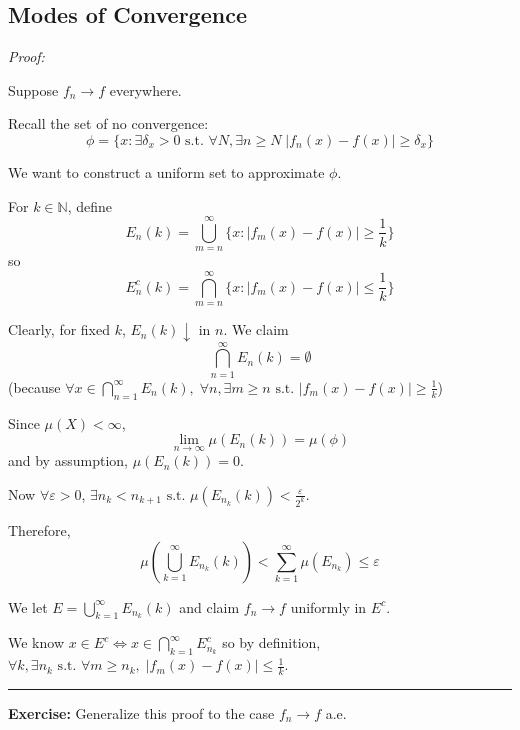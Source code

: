 \documentclass[12pt]{report}
\newcommand{\N}{\mathbb{N}}
\newcommand{\abs}[1]{\left\vert #1 \right\vert}
\newcommand{\ep}{\varepsilon}
\newcommand{\sub}{\subseteq}
\newcommand{\st}{\text{ s.t. }}
\renewcommand{\div}{\vspace*{10pt}\hrule\vspace*{10pt}}
\newenvironment*{tbox}[2][gray]{
    \begin{tcolorbox}[
        parbox=false,
        colback=#1!5!white,
        colframe=#1!75!black,
        breakable,
        title={#2}
    ]}
    {\end{tcolorbox}}
\newenvironment*{exercise}[1][red]{
    \begin{tcolorbox}[
        parbox=false,
        colback=#1!5!white,
        colframe=#1!75!black,
        breakable
    ]}
    {\end{tcolorbox}}
\begin{document}
    \subsection*{Modes of Convergence}
        \begin{tbox}{\textbf{Egorov Theorem:} Suppose $\mu(X) < \infty$ and $f_n \to f$ a.e. Then $\forall \ep > 0$, $\exists E \sub X$ such that $\mu(E) < \ep$ with $f_n - f \to 0$ uniformly on $E^c$}
            \emph{Proof:} 

            Suppose $f_n \to f$ everywhere. 

            Recall the set of no convergence: 
            \[\phi = \{x: \exists \delta_x > 0 \st \forall N, \exists n \geq N \; \abs{f_n(x) - f(x)} \geq \delta_x\}\]

            We want to construct a uniform set to approximate $\phi$. 

            For $k \in \N$, define 
            \[E_n(k) = \bigcup_{m=n}^\infty \{x: \abs{f_m(x) - f(x)} \geq \frac{1}{k}\}\]
            so 
            \[E_n^c(k) = \bigcap_{m=n}^{\infty} \{x: \abs{f_m(x) - f(x)} \leq \frac{1}{k}\}\]

            Clearly, for fixed $k$, $E_n(k) \downarrow$ in $n$. We claim 
            \[\bigcap_{n=1}^\infty E_n(k) = \emptyset\]
            (because $\forall x \in \bigcap_{n=1}^\infty E_n(k), \; \forall n, \exists m \geq n \st \abs{f_m(x) - f(x)} \geq \frac{1}{k}$)

            Since $\mu(X) < \infty$, 
            \[\lim_{n \to \infty} \mu(E_n(k)) = \mu(\phi)\] 
            and by assumption, $\mu(E_n(k)) = 0$. 

            Now $\forall \ep > 0$, $\exists n_k < n_{k+1} \st \mu(E_{n_k}(k)) < \frac{\ep}{2^k}$. 

            Therefore, 
            \[\mu\left(\bigcup_{k=1}^\infty E_{n_k}(k)\right) < \sum_{k=1}^{\infty} \mu(E_{n_k}) \leq \ep \]

            We let $E = \bigcup_{k=1}^\infty E_{n_k}(k)$ and claim $f_n \to f$ uniformly in $E^c$. 

            We know $x \in E^c \iff x \in \bigcap_{k=1}^\infty E_{n_k}^c$ so by definition, $\forall k, \exists n_k \st \forall m \geq n_k,\; \abs{f_{m}(x) - f(x)} \leq \frac{1}{k}$. 

            \div 

            \begin{exercise}
                \textbf{Exercise:} Generalize this proof to the case $f_n \to f$ a.e. 
            \end{exercise}
        \end{tbox}
\end{document}
